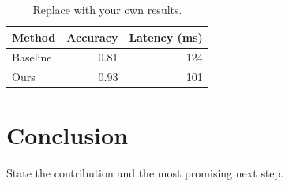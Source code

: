 \documentclass[conference]{IEEEtran}
\begin{document}
\begin{table}[htbp]
  \caption{Replace with your own results.}
  \label{tab:results}
  \centering
  \begin{tabular}{lrr}
    \toprule
    Method   & Accuracy & Latency (ms) \\
    \midrule
    Baseline & 0.81     & 124          \\
    Ours     & 0.93     & 101          \\
    \bottomrule
  \end{tabular}
\end{table}

\section{Conclusion}
\label{sec:conclusion}

State the contribution and the most promising next step.



\end{document}
